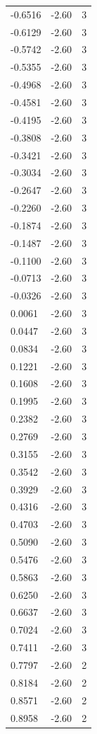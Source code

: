 \begin{longtable}{lrr}
  -0.6516 & -2.60 & 3 \\
  -0.6129 & -2.60 & 3 \\
  -0.5742 & -2.60 & 3 \\
  -0.5355 & -2.60 & 3 \\
  -0.4968 & -2.60 & 3 \\
  -0.4581 & -2.60 & 3 \\
  -0.4195 & -2.60 & 3 \\
  -0.3808 & -2.60 & 3 \\
  -0.3421 & -2.60 & 3 \\
  -0.3034 & -2.60 & 3 \\
  -0.2647 & -2.60 & 3 \\
  -0.2260 & -2.60 & 3 \\
  -0.1874 & -2.60 & 3 \\
  -0.1487 & -2.60 & 3 \\
  -0.1100 & -2.60 & 3 \\
  -0.0713 & -2.60 & 3 \\
  -0.0326 & -2.60 & 3 \\
  0.0061 & -2.60 & 3 \\
  0.0447 & -2.60 & 3 \\
  0.0834 & -2.60 & 3 \\
  0.1221 & -2.60 & 3 \\
  0.1608 & -2.60 & 3 \\
  0.1995 & -2.60 & 3 \\
  0.2382 & -2.60 & 3 \\
  0.2769 & -2.60 & 3 \\
  0.3155 & -2.60 & 3 \\
  0.3542 & -2.60 & 3 \\
  0.3929 & -2.60 & 3 \\
  0.4316 & -2.60 & 3 \\
  0.4703 & -2.60 & 3 \\
  0.5090 & -2.60 & 3 \\
  0.5476 & -2.60 & 3 \\
  0.5863 & -2.60 & 3 \\
  0.6250 & -2.60 & 3 \\
  0.6637 & -2.60 & 3 \\
  0.7024 & -2.60 & 3 \\
  0.7411 & -2.60 & 3 \\
  0.7797 & -2.60 & 2 \\
  0.8184 & -2.60 & 2 \\
  0.8571 & -2.60 & 2 \\
  0.8958 & -2.60 & 2 \\

\end{longtable}
